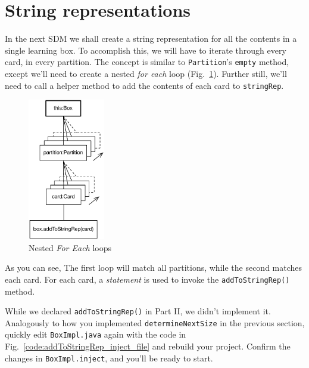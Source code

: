 \newpage
\hypertarget{sec:stringRep}{}
\section{String representations}
\genHeader

In the next SDM we shall create a string representation for all the contents in a single learning box. To accomplish this, we will have to iterate through 
every card, in every partition. The concept is similar to \texttt{Partition}'s \texttt{empty} method, except we'll need to create a nested \emph{for each}
loop (Fig.~\ref{fig:goal_stringRep}). Further still, we'll need to call a helper method to add the contents of each card to \texttt{stringRep}.

\vspace{1cm}

\begin{figure}[htbp]
	\centering
	\includegraphics[width=0.3\textwidth]{goal_stringRep.pdf}
	\caption{Nested \emph{For Each} loops}
	\label{fig:goal_stringRep}
\end{figure}

\vspace{1cm}

As you can see, The first loop will match all partitions, while the second matches each card. For each card, a \emph{statement} is used to invoke the
\texttt{addToStringRep()} method.

\vspace{0.5cm}

While we declared \texttt{addToStringRep()} in Part II, we didn't implement it. Analogously to how you implemented \texttt{determineNextSize} in the
previous section, quickly edit \texttt{BoxImpl.java} again with the code in Fig.~\ref{code:addToStringRep_inject_file} and rebuild your
project. Confirm the changes in \texttt{BoxImpl.inject}, and you'll be ready to start.

